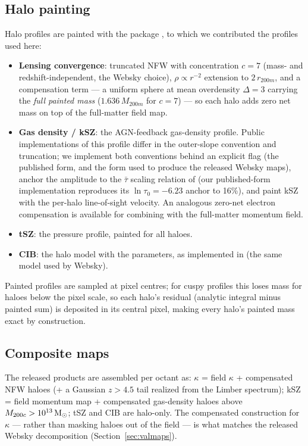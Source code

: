 \subsection{Halo painting}
\label{sec:maps-halo}

Halo profiles are painted with the  package \citep{XGPaint},
to which we contributed the profiles used here:
\begin{itemize}
  \item \textbf{Lensing convergence}: truncated NFW with concentration $c=7$
  (mass- and redshift-independent, the Websky choice), $\rho\propto r^{-2}$
  extension to $2\,r_{200m}$, and a compensation term --- a uniform sphere at
  mean overdensity $\Delta=3$ carrying the \emph{full painted mass}
  ($1.636\,M_{200m}$ for $c=7$) --- so each halo adds zero net mass on top of
  the full-matter field map.
  \item \textbf{Gas density / kSZ}: the \citet{Battaglia2016} AGN-feedback
  gas-density profile. Public implementations of this profile differ in the
  outer-slope convention and truncation; we implement both conventions behind
  an explicit flag (the published form, and the form used to produce the
  released Websky maps), anchor the amplitude to the $\bar\tau$ scaling
  relation of \citet{Battaglia2016} (our published-form implementation
  reproduces its $\ln\tau_0=-6.23$ anchor to 16\%), and paint kSZ with the
  per-halo line-of-sight velocity. An analogous zero-net electron
  compensation is available for combining with the full-matter momentum
  field.
  \item \textbf{tSZ}: the \citet{Battaglia2012} pressure profile, painted for
  all haloes.
  \item \textbf{CIB}: the \citet{Shang2012} halo model with the
  \citet{PlanckCIB2013} parameters, as implemented in  (the same
  model used by Websky).
\end{itemize}
Painted profiles are sampled at pixel centres; for cuspy profiles this loses
mass for haloes below the pixel scale, so each halo's residual (analytic
integral minus painted sum) is deposited in its central pixel, making every
halo's painted mass exact by construction.

\subsection{Composite maps}
\label{sec:maps-composite}

The released products are assembled per octant as: $\kappa$ = field
$\kappa$ + compensated NFW haloes (+ a Gaussian $z>4.5$ tail realized from
the Limber spectrum); kSZ = field momentum map + compensated gas-density
haloes above $M_{200c}>10^{13}\,\mathrm{M}_\odot$; tSZ and CIB are halo-only. The
compensated construction for $\kappa$ --- rather than masking haloes out of
the field --- is what matches the released Websky decomposition
(Section~\ref{sec:valmaps}).
